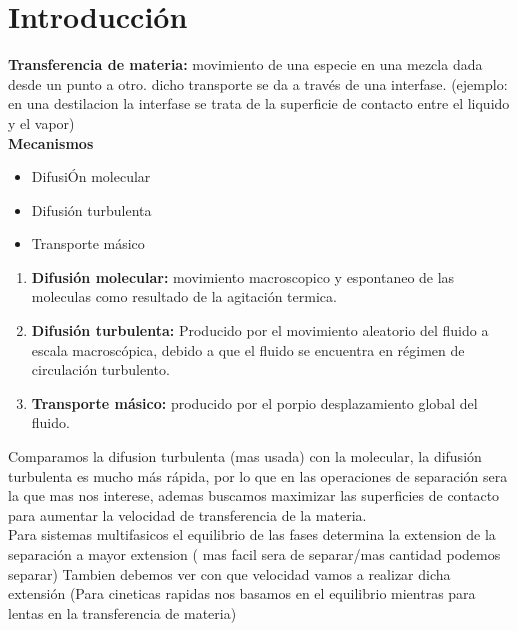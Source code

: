 \documentclass{report}
\begin{document}
\section{Introducción}
\begin{raggedright}
	\textbf{Transferencia de materia:} movimiento de una especie en una mezcla dada desde un punto a otro. dicho transporte
	se da a través de una interfase. (ejemplo: en una destilacion la interfase se trata de la superficie de contacto entre el liquido y el vapor)\\
\vspace{2\baselineskip}
\textbf{Mecanismos}
	\begin{itemize}
		\item DifusiÓn molecular
		\item Difusión turbulenta
		\item Transporte másico
	\end{itemize}
\begin{enumerate}
	\item \textbf{Difusión molecular:} movimiento macroscopico y espontaneo de las moleculas como resultado de la agitación termica.\\
	\item \textbf{Difusión turbulenta:} Producido por el movimiento aleatorio del fluido a escala macroscópica, debido a que el fluido se encuentra en régimen de circulación turbulento.\\
	\item \textbf{Transporte másico:} producido por el porpio desplazamiento global del fluido.\\
\end{enumerate}
Comparamos la difusion turbulenta (mas usada) con la molecular, la difusión turbulenta es mucho más rápida, por lo que en las operaciones de separación
sera la que mas nos interese, ademas buscamos maximizar las superficies de contacto para aumentar la velocidad de transferencia de la materia.\\

Para sistemas multifasicos el equilibrio de las fases determina la extension de la separación a mayor extension ( mas facil sera de separar/mas cantidad podemos separar)
Tambien debemos ver con que velocidad vamos a realizar dicha extensión (Para cineticas rapidas nos basamos en el equilibrio mientras para lentas en la transferencia de materia)\\


\end{raggedright}
\end{document}
